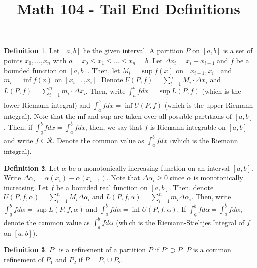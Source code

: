 \documentclass[12pt]{article}
\theoremstyle{definition}
\newtheorem{definition}{Definition}
\theoremstyle{named}
\begin{document}
\title{Math 104 - Tail End Definitions}
\author{}
\date{}
\maketitle
\date

\renewcommand{\thedefinition}{6.1}
\begin{definition}
    Let $[a,b]$ be the given interval. A partition $P$ on $[a,b]$ is a set of points $x_0, \dots, x_n$ with $a=x_0 \leq x_1 \leq \dots \leq x_n = b$. Let $\Delta x_i = x_i - x_{i-1}$ and $f$ be a bounded function on $[a,b]$. Then, let $M_i = \sup f(x)$ on $[x_{i-1}, x_i]$ and $m_i = \inf f(x)$ on $[x_{i-1}, x_i]$. Denote $U(P,f) = \sum_{i=1}^{n} M_i \cdot \Delta x_i$ and $L(P,f) = \sum_{i=1}^{n} m_i \cdot \Delta x_i$. Then, write $\int_{\underline{a}}^{b} f dx = \sup L(P,f)$ (which is the lower Riemann integral) and $\int_{a}^{\overline{b}} f dx = \inf U(P,f)$ (which is the upper Riemann integral). Note that the inf and sup are taken over all possible partitions of $[a,b]$. Then, if $\int_{\underline{a}}^{b} f dx = \int_{a}^{\overline{b}} f dx$, then, we say that $f$ is Riemann integrable on $[a,b]$ and write $f\in\mathscr{R}$. Denote the common value as $\int_{a}^{b} f dx$ (which is the Riemann integral). 
\end{definition}

\renewcommand{\thedefinition}{6.2}
\begin{definition}
    Let $\alpha$ be a monotonically increasing function on an interval $[a,b]$. Write $\Delta \alpha_i = \alpha(x_i) - \alpha(x_{i-1})$. Note that $\Delta \alpha_i \geq 0$ since $\alpha$ is monotonically increasing. Let $f$ be a bounded real function on $[a,b]$. Then, denote $U(P,f,\alpha) = \sum_{i=1}^{n} M_i \Delta \alpha_i$ and $L(P,f,\alpha) = \sum_{i=1}^{n} m_i \Delta \alpha_i$. Then, write $\int_{\underline{a}}^{b} f d\alpha = \sup L(P,f,\alpha)$ and $\int_{a}^{\overline{b}} f d\alpha = \inf U(P,f,\alpha)$. If $\int_{\underline{a}}^{b} f d\alpha = \int_{a}^{\overline{b}} f d\alpha$, denote the common value as $\int_{a}^{b} f d\alpha$ (which is the Riemann-Stieltjes Integral of $f$ on $[a,b]$). 
\end{definition}

\renewcommand{\thedefinition}{6.3}
\begin{definition}
    $P^\star$ is a refinement of a partition $P$ if $P^\star \supset P$. $P$ is a common refinement of $P_1$ and $P_2$ if $P = P_1 \cup P_2$. 
\end{definition}
\end{document}
